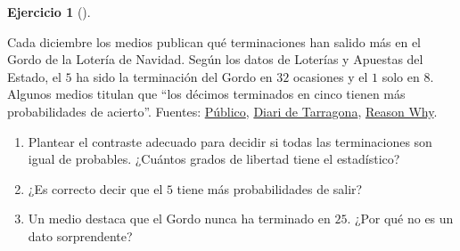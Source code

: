\documentclass[
  spanish,
  a4paper,
]{scrreport}
\theoremstyle{definition}
\newtheorem{exercise}{Ejercicio}[chapter]
\theoremstyle{remark}
\begin{document}
\begin{exercise}[]\protect\hypertarget{exr-interpretacion-loteria-navidad}{}\label{exr-interpretacion-loteria-navidad}

Cada diciembre los medios publican qué terminaciones han salido más en
el Gordo de la Lotería de Navidad. Según los datos de Loterías y
Apuestas del Estado, el \(5\) ha sido la terminación del Gordo en \(32\)
ocasiones y el \(1\) solo en \(8\). Algunos medios titulan que ``los
décimos terminados en cinco tienen más probabilidades de acierto''.
Fuentes:
\href{https://www.publico.es/sociedad/loteria-navidad-2023-numero-veces-terminado-gordo.html}{Público},
\href{https://www.diaridetarragona.com/internacional/104016/estadistica-y-supersticion-mitos-en-la-loteria-20191220-0052-fsdt201912200052.html}{Diari
de Tarragona},
\href{https://www.reasonwhy.es/actualidad/sociedad-y-consumo/loteria-de-navidad-curiosidades-cifras-y-consumo-2014-12-19}{Reason
Why}.

\begin{enumerate}
\def\labelenumi{\alph{enumi}.}
\item
  Plantear el contraste adecuado para decidir si todas las terminaciones
  son igual de probables. ¿Cuántos grados de libertad tiene el
  estadístico?
\item
  ¿Es correcto decir que el \(5\) tiene más probabilidades de salir?
\item
  Un medio destaca que el Gordo nunca ha terminado en \(25\). ¿Por qué
  no es un dato sorprendente?
\end{enumerate}

\end{exercise}
\end{document}

